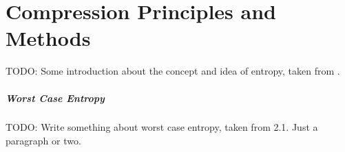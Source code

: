 
\chapter{Compression Principles and Methods}

\label{ch:Chapter2} %

TODO: Some introduction about the concept and idea of entropy, taken from \cite{Shannon1948,navarro2016compact,han2002mathematics}.

\paragraph{Worst Case Entropy} TODO: Write something about worst case entropy, taken from \cite{navarro2016compact} 2.1. Just a paragraph or two.








